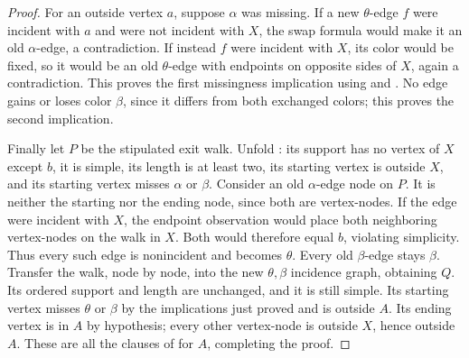 \begin{proof}
For an outside vertex $a$, suppose $\alpha$ was missing. If a new
$\theta$-edge $f$ were incident with $a$ and were not incident with $X$,
the swap formula would make it an old $\alpha$-edge, a contradiction.
If instead $f$ were incident with $X$, its color would be fixed, so it
would be an old $\theta$-edge with endpoints on opposite sides of $X$,
again a contradiction. This proves the first missingness implication
using  and . No edge gains
or loses color $\beta$, since it differs from both exchanged colors;
this proves the second implication.

Finally let $P$ be the stipulated exit walk. Unfold
: its support has no vertex of $X$ except $b$,
it is simple, its length is at least two, its starting vertex is outside
$X$, and its starting vertex misses $\alpha$ or $\beta$. Consider an
old $\alpha$-edge node on $P$. It is neither the starting nor the ending
node, since both are vertex-nodes. If the edge were incident with $X$,
the endpoint observation would place both neighboring vertex-nodes on
the walk in $X$. Both would therefore equal $b$, violating simplicity.
Thus every such edge is nonincident and becomes $\theta$. Every old
$\beta$-edge stays $\beta$. Transfer the walk, node by node, into the
new $\theta,\beta$ incidence graph, obtaining $Q$. Its ordered support
and length are unchanged, and it is still simple. Its starting vertex
misses $\theta$ or $\beta$ by the implications just proved and is
outside $A$. Its ending vertex is in $A$ by hypothesis; every other
vertex-node is outside $X$, hence outside $A$. These are all the clauses
of  for $A$, completing the proof.
\end{proof}
